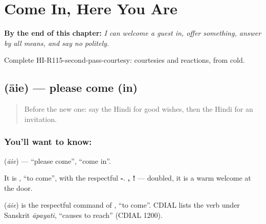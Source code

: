 
\chapter{Come In, Here You Are}
\label{ch:hi-come-in}

\begin{chapteropening}
\textbf{By the end of this chapter:} \emph{I can welcome a guest in, offer something, answer by all means, and say no politely.}

Complete HI-R115-second-pass-courtesy: courtesies and reactions, from cold.
\end{chapteropening}

\section[\texorpdfstring{\hi{आइए} (āie)}{आइए (āie)}]{ (āie) — please come (in)}

\label{lesson:HI-C115-aie}



\begin{quote}
Before the new one: say the Hindi for good wishes, then the Hindi for an invitation.
\end{quote}

\subsection*{You'll want to know: }
\textbf{} (\emph{āie}) — \textquotedblleft{}please come\textquotedblright{}, \textquotedblleft{}come in\textquotedblright{}.

It is \textbf{}, \textquotedblleft{}to come\textquotedblright{}, with the respectful \textbf{-}. \textbf{, !} — doubled, it is a warm welcome at the door.

\begin{cousinweb}
\textbf{} (\emph{āie}) is the respectful command of \textbf{}, \textquotedblleft{}to come\textquotedblright{}. CDIAL lists the verb under Sanskrit \emph{āpayati}, \textquotedblleft{}causes to reach\textquotedblright{} (CDIAL 1200).
\end{cousinweb}

